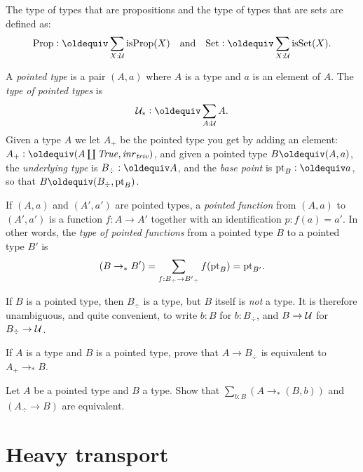 \begin{definition}\label{def:Prop-Set}
The type of types that are propositions and the 
type of types that are sets are defined as:
\[\Prop\defeq \sum_{X:\UU}\isprop(X)\quad
\text{and}\quad\Set\defeq \sum_{X:\UU}\isset(X).\]
\end{definition}

\begin{definition}\label{def:pointedtypes}
 A \emph{pointed type} is a pair $(A,a)$ where $A$ is a type
 and $a$ is an element of $A$. The \emph{type of pointed types} is
\[\UUp \defeq \sum_{A:\UU} A.\]
Given a type $A$ we let $A_+$ be the pointed type you get 
by adding an element: $A_+\defequi(A\coprod\true,\inr{\triv})$, 
and given a pointed type $B\jdeq(A,a)$, the \emph{underlying type} 
is $B_\div\defeq A$, and the \emph{base point} is $\pt_B\defeq a$, 
so that $B\jdeq (B_\div,\pt_B)$.  

If $(A,a)$ and $(A',a')$ are pointed types, 
a \emph{pointed function} from  $(A,a)$ to $(A',a')$ is 
a function $f:A\to A'$ together with an identification $p:f(a)=a'$. 
In other words, the \emph{type of pointed functions} from a pointed 
type $B$ to a pointed type $B'$ is
\[(B\to_*B')=\sum_{f:B_\div\to B'{}_\div}f({\mathord{\mathrm{pt}}}_B)={\mathord{\mathrm{pt}}}_{B'}.\]
\end{definition}

If $B$ is a pointed type, then $B_\div $ is a type, but $B$ itself is
\emph{not} a type. It is therefore unambiguous, and quite convenient,
to write $b:B$ for $b:B_\div$, and $B\to\mathcal{U}$ for $B_\div\to\mathcal{U}$.

\begin{xca}\label{xca:plusforgetadjoint}
If $A$ is a type and $B$ is a pointed type, 
prove that $A\to B_\div$ is equivalent to $A_+\to_*B$.
\end{xca}

\begin{xca}\label{xca:freemaps}
  Let $A$ be a pointed type and $B$ a type.  Show that  
$\sum_{b:B}(A\to_*(B,b))$ and $(A_\div\to B)$ are equivalent.
\end{xca}


\section{Heavy transport}
\label{sec:heavy-transport}

